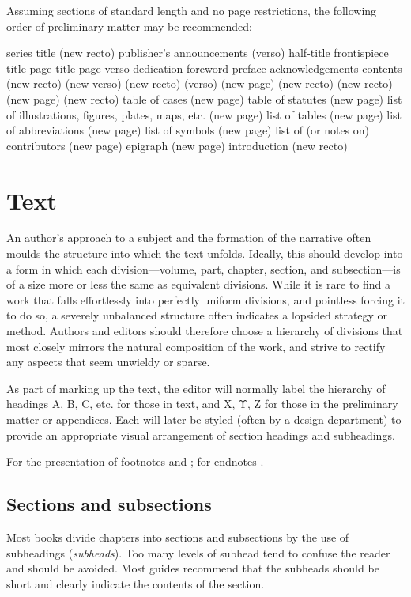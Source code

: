 Assuming sections of standard length and no page restrictions, the
following order of preliminary matter may be recommended:

series title (new recto)
publisher's announcements (verso)
half-title
frontispiece
title page
title page verso
dedication
foreword
preface
acknowledgements
contents
(new recto)
(new verso)
(new recto)
(verso)
(new page)
(new recto)
(new recto)
(new page)
(new recto)
table of cases (new page)
table of statutes (new page)
list of illustrations, figures,
plates, maps, etc. (new page)
list of tables (new page)
list of abbreviations (new page)
list of symbols (new page)
list of (or notes on)
contributors (new page)
epigraph (new page)
introduction (new recto)

\section{Text}

An author's approach to a subject and the formation of the narrative
often moulds the structure into which the text unfolds. Ideally,
this should develop into a form in which each division—volume, part,
chapter, section, and subsection—is of a size more or less the same as
equivalent divisions. While it is rare to find a work that falls effortlessly
into perfectly uniform divisions, and pointless forcing it to do so, a
severely unbalanced structure often indicates a lopsided strategy or
method. Authors and editors should therefore choose a hierarchy of
divisions that most closely mirrors the natural composition of the
work, and strive to rectify any aspects that seem unwieldy or sparse.

As part of marking up the text, the editor will normally label the
hierarchy of headings A, B, C, etc. for those in text, and Χ, Υ, Ζ for
those in the preliminary matter or appendices. Each will later be styled
(often by a design department) to provide an appropriate visual arrangement
of section headings and subheadings.

For the presentation of footnotes  and ; for endnotes
.




\subsection{Sections and subsections}
\label{sections}

Most books divide chapters into sections and subsections by the use of subheadings (\emph{subheads}). Too many levels of subhead tend to confuse the reader and should be avoided. Most guides recommend that the subheads should be short and clearly indicate the contents of the section.

